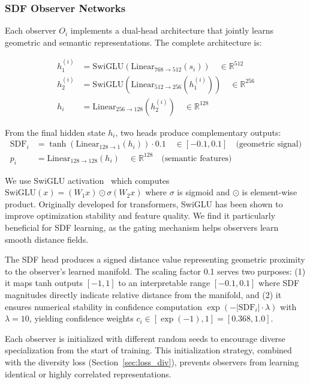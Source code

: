 \documentclass[10pt,twocolumn,letterpaper]{article}
\begin{document}
\subsubsection{SDF Observer Networks}
\label{sec:observers}

Each observer $O_i$ implements a dual-head architecture that jointly learns geometric and semantic representations. The complete architecture is:

\begin{align}
h_1^{(i)} &= \text{SwiGLU}(\text{Linear}_{768 \to 512}(s_i)) \quad \in \mathbb{R}^{512} \\
h_2^{(i)} &= \text{SwiGLU}(\text{Linear}_{512 \to 256}(h_1^{(i)})) \quad \in \mathbb{R}^{256} \\
h_i &= \text{Linear}_{256 \to 128}(h_2^{(i)}) \quad \in \mathbb{R}^{128}
\end{align}

From the final hidden state $h_i$, two heads produce complementary outputs:
\begin{align}
\text{SDF}_i &= \tanh(\text{Linear}_{128 \to 1}(h_i)) \cdot 0.1 \quad \in [-0.1, 0.1] \quad \text{(geometric signal)} \\
p_i &= \text{Linear}_{128 \to 128}(h_i) \quad \in \mathbb{R}^{128} \quad \text{(semantic features)}
\end{align}

We use SwiGLU activation~\cite{swiglu} which computes $\text{SwiGLU}(x) = (W_1 x) \odot \sigma(W_2 x)$ where $\sigma$ is sigmoid and $\odot$ is element-wise product. Originally developed for transformers, SwiGLU has been shown to improve optimization stability and feature quality. We find it particularly beneficial for SDF learning, as the gating mechanism helps observers learn smooth distance fields.

The SDF head produces a signed distance value representing geometric proximity to the observer's learned manifold. The scaling factor 0.1 serves two purposes: (1) it maps tanh outputs $[-1, 1]$ to an interpretable range $[-0.1, 0.1]$ where SDF magnitudes directly indicate relative distance from the manifold, and (2) it ensures numerical stability in confidence computation $\exp(-|\text{SDF}_i| \cdot \lambda)$ with $\lambda=10$, yielding confidence weights $c_i \in [\exp(-1), 1] = [0.368, 1.0]$.

Each observer is initialized with different random seeds to encourage diverse specialization from the start of training. This initialization strategy, combined with the diversity loss (Section~\ref{sec:loss_div}), prevents observers from learning identical or highly correlated representations.
\end{document}
